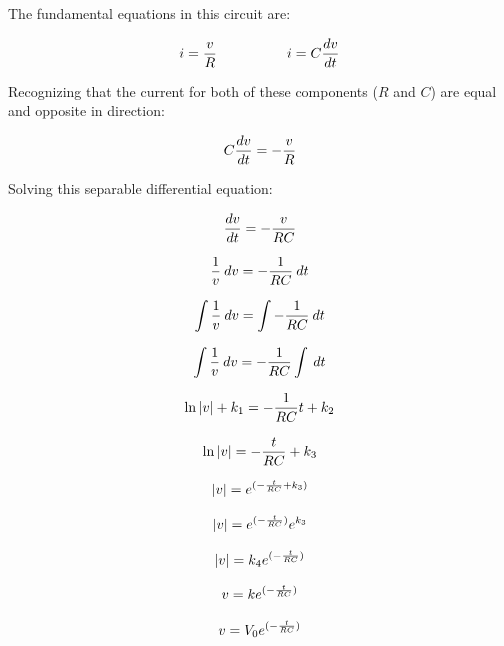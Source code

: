 The fundamental equations in this circuit are:

$$i = {v \over R} \hbox{\hskip 50pt} i = C {dv \over dt}$$

Recognizing that the current for both of these components ($R$ and $C$) are equal and opposite in direction:

$$C {dv \over dt} = - {v \over R}$$

Solving this separable differential equation:

$${dv \over dt} = - {v \over RC}$$

$${1 \over v} \> dv = - {1 \over RC} \> dt$$

$$\int {1 \over v} \> dv = \int -{1 \over RC} \> dt$$

$$\int {1 \over v} \> dv = - {1 \over RC} \int \> dt$$

$$\ln |v| + k_1 = - {1 \over RC} t + k_2$$

$$\ln |v| = - {t \over RC} + k_3$$

$$|v| = e^{(- {t \over RC} + k_3)}$$

$$|v| = e^{(- {t \over RC})} e^{k_3}$$

$$|v| = k_4 e^{(- {t \over RC})}$$

$$v = k e^{(- {t \over RC})}$$

$$v = V_0 e^{(- {t \over RC})}$$





